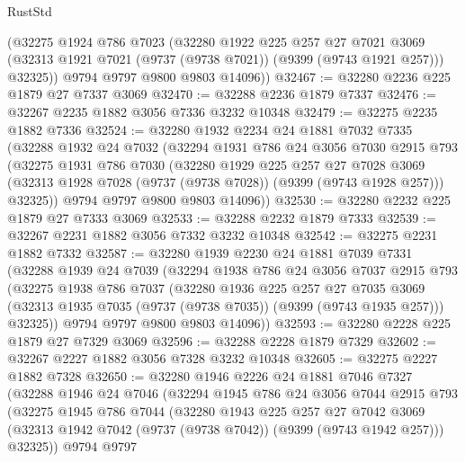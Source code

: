 \begin{lexlean}{RustStd}
\begin{coremodule}
        (@32275
          @1924
          @786
          @7023
          (@32280
            @1922
            @225
            @257
            @27
            @7021
            @3069
            (@32313 @1921 @7021 (@9737 (@9738 @7021)) (@9399 (@9743 @1921 @257)))
            @32325))
        @9794
        @9797
        @9800
        @9803
        @14096))
@32467 := @32280 @2236 @225 @1879 @27 @7337 @3069
@32470 := @32288 @2236 @1879 @7337
@32476 := @32267 @2235 @1882 @3056 @7336 @3232 @10348
@32479 := @32275 @2235 @1882 @7336
@32524 := @32280
    @1932
    @2234
    @24
    @1881
    @7032
    @7335
    (@32288
      @1932
      @24
      @7032
      (@32294
        @1931
        @786
        @24
        @3056
        @7030
        @2915
        @793
        (@32275
          @1931
          @786
          @7030
          (@32280
            @1929
            @225
            @257
            @27
            @7028
            @3069
            (@32313 @1928 @7028 (@9737 (@9738 @7028)) (@9399 (@9743 @1928 @257)))
            @32325))
        @9794
        @9797
        @9800
        @9803
        @14096))
@32530 := @32280 @2232 @225 @1879 @27 @7333 @3069
@32533 := @32288 @2232 @1879 @7333
@32539 := @32267 @2231 @1882 @3056 @7332 @3232 @10348
@32542 := @32275 @2231 @1882 @7332
@32587 := @32280
    @1939
    @2230
    @24
    @1881
    @7039
    @7331
    (@32288
      @1939
      @24
      @7039
      (@32294
        @1938
        @786
        @24
        @3056
        @7037
        @2915
        @793
        (@32275
          @1938
          @786
          @7037
          (@32280
            @1936
            @225
            @257
            @27
            @7035
            @3069
            (@32313 @1935 @7035 (@9737 (@9738 @7035)) (@9399 (@9743 @1935 @257)))
            @32325))
        @9794
        @9797
        @9800
        @9803
        @14096))
@32593 := @32280 @2228 @225 @1879 @27 @7329 @3069
@32596 := @32288 @2228 @1879 @7329
@32602 := @32267 @2227 @1882 @3056 @7328 @3232 @10348
@32605 := @32275 @2227 @1882 @7328
@32650 := @32280
    @1946
    @2226
    @24
    @1881
    @7046
    @7327
    (@32288
      @1946
      @24
      @7046
      (@32294
        @1945
        @786
        @24
        @3056
        @7044
        @2915
        @793
        (@32275
          @1945
          @786
          @7044
          (@32280
            @1943
            @225
            @257
            @27
            @7042
            @3069
            (@32313 @1942 @7042 (@9737 (@9738 @7042)) (@9399 (@9743 @1942 @257)))
            @32325))
        @9794
        @9797

\end{coremodule}
\end{lexlean}
